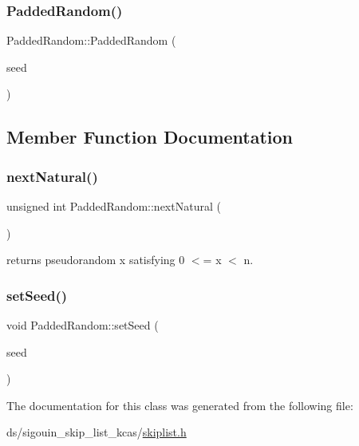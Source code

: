 \subsubsection{\texorpdfstring{Padded\+Random()}{PaddedRandom()}\hspace{0.1cm}{\footnotesize\ttfamily [2/2]}}
{\footnotesize\ttfamily Padded\+Random\+::\+Padded\+Random (\begin{DoxyParamCaption}\item[{int}]{seed }\end{DoxyParamCaption})\hspace{0.3cm}{\ttfamily [inline]}}



\subsection{Member Function Documentation}
\mbox{\label{classPaddedRandom_aa9ff82999be9687fd48ffa3ea5fb2628}} 
\subsubsection{\texorpdfstring{next\+Natural()}{nextNatural()}}
{\footnotesize\ttfamily unsigned int Padded\+Random\+::next\+Natural (\begin{DoxyParamCaption}{ }\end{DoxyParamCaption})\hspace{0.3cm}{\ttfamily [inline]}}

returns pseudorandom x satisfying 0 $<$= x $<$ n. \mbox{\label{classPaddedRandom_a9229cc2aed4ba44d85799e6783b4f85e}} 
\subsubsection{\texorpdfstring{set\+Seed()}{setSeed()}}
{\footnotesize\ttfamily void Padded\+Random\+::set\+Seed (\begin{DoxyParamCaption}\item[{int}]{seed }\end{DoxyParamCaption})\hspace{0.3cm}{\ttfamily [inline]}}



The documentation for this class was generated from the following file\+:\begin{DoxyCompactItemize}
\item 
ds/sigouin\+\_\+skip\+\_\+list\+\_\+kcas/\hyperlink{skiplist_8h}{skiplist.\+h}\end{DoxyCompactItemize}
